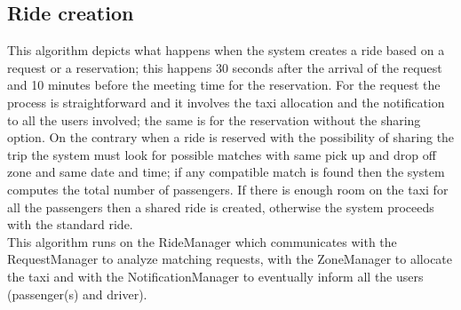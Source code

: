 \documentclass[a4paper,11pt]{report} %
\begin{document}
	\pagebreak
	
	\subsection{Ride creation}
	This algorithm depicts what happens when the system creates a ride based on a request or a reservation; this happens 30 seconds after the arrival of the request and 10 minutes before the meeting time for the reservation. For the request the process is straightforward and it involves the taxi allocation and the notification to all the users involved; the same is for the reservation without the sharing option. On the contrary when a ride is reserved with the possibility of sharing the trip the system must look for possible matches with same pick up and drop off zone and same date and time; if any compatible match is found then the system computes the total number of passengers. If there is enough room on the taxi for all the passengers then a shared ride is created, otherwise the system proceeds with the standard ride.\\
	This algorithm runs on the RideManager which communicates with the RequestManager to analyze matching requests, with the ZoneManager to allocate the taxi and with the NotificationManager to eventually inform all the users (passenger(s) and driver).\\
	
\end{document}
